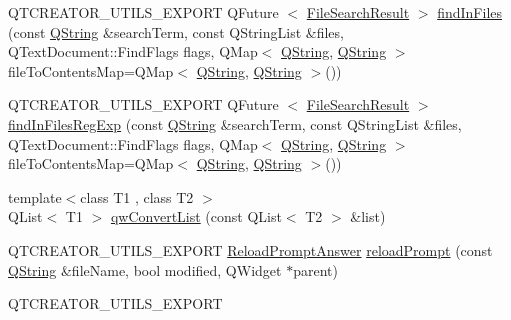 \begin{DoxyCompactItemize}
\item 
\-Q\-T\-C\-R\-E\-A\-T\-O\-R\-\_\-\-U\-T\-I\-L\-S\-\_\-\-E\-X\-P\-O\-R\-T \-Q\-Future\*
$<$ \hyperlink{class_utils_1_1_file_search_result}{\-File\-Search\-Result} $>$ \hyperlink{namespace_utils_a587622bfe7a8df689b88274dab06c768}{find\-In\-Files} (const \hyperlink{group___u_a_v_objects_plugin_gab9d252f49c333c94a72f97ce3105a32d}{\-Q\-String} \&search\-Term, const \-Q\-String\-List \&files, \-Q\-Text\-Document\-::\-Find\-Flags flags, \-Q\-Map$<$ \hyperlink{group___u_a_v_objects_plugin_gab9d252f49c333c94a72f97ce3105a32d}{\-Q\-String}, \hyperlink{group___u_a_v_objects_plugin_gab9d252f49c333c94a72f97ce3105a32d}{\-Q\-String} $>$ file\-To\-Contents\-Map=\-Q\-Map$<$ \hyperlink{group___u_a_v_objects_plugin_gab9d252f49c333c94a72f97ce3105a32d}{\-Q\-String}, \hyperlink{group___u_a_v_objects_plugin_gab9d252f49c333c94a72f97ce3105a32d}{\-Q\-String} $>$())
\item 
\-Q\-T\-C\-R\-E\-A\-T\-O\-R\-\_\-\-U\-T\-I\-L\-S\-\_\-\-E\-X\-P\-O\-R\-T \-Q\-Future\*
$<$ \hyperlink{class_utils_1_1_file_search_result}{\-File\-Search\-Result} $>$ \hyperlink{namespace_utils_a1047918bf7a1fa4b7f066a4f27df1990}{find\-In\-Files\-Reg\-Exp} (const \hyperlink{group___u_a_v_objects_plugin_gab9d252f49c333c94a72f97ce3105a32d}{\-Q\-String} \&search\-Term, const \-Q\-String\-List \&files, \-Q\-Text\-Document\-::\-Find\-Flags flags, \-Q\-Map$<$ \hyperlink{group___u_a_v_objects_plugin_gab9d252f49c333c94a72f97ce3105a32d}{\-Q\-String}, \hyperlink{group___u_a_v_objects_plugin_gab9d252f49c333c94a72f97ce3105a32d}{\-Q\-String} $>$ file\-To\-Contents\-Map=\-Q\-Map$<$ \hyperlink{group___u_a_v_objects_plugin_gab9d252f49c333c94a72f97ce3105a32d}{\-Q\-String}, \hyperlink{group___u_a_v_objects_plugin_gab9d252f49c333c94a72f97ce3105a32d}{\-Q\-String} $>$())
\item 
{\footnotesize template$<$class T1 , class T2 $>$ }\\\-Q\-List$<$ \-T1 $>$ \hyperlink{namespace_utils_a5c29006755696c9137ee52bdba2cee70}{qw\-Convert\-List} (const \-Q\-List$<$ \-T2 $>$ \&list)
\item 
\-Q\-T\-C\-R\-E\-A\-T\-O\-R\-\_\-\-U\-T\-I\-L\-S\-\_\-\-E\-X\-P\-O\-R\-T \*
\hyperlink{namespace_utils_a4b02d8e41b34d9ba5605aa6235965efb}{\-Reload\-Prompt\-Answer} \hyperlink{namespace_utils_a655096ab9b7f2728a33b2245f49dd047}{reload\-Prompt} (const \hyperlink{group___u_a_v_objects_plugin_gab9d252f49c333c94a72f97ce3105a32d}{\-Q\-String} \&file\-Name, bool modified, \-Q\-Widget $\ast$parent)
\item 
\-Q\-T\-C\-R\-E\-A\-T\-O\-R\-\_\-\-U\-T\-I\-L\-S\-\_\-\-E\-X\-P\-O\-R\-T \*

\end{DoxyCompactItemize}
